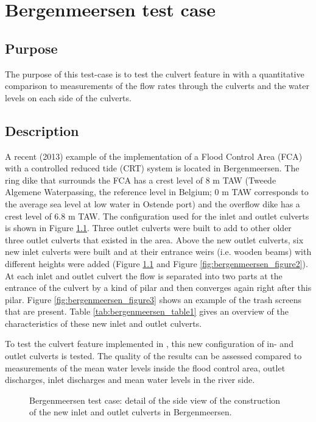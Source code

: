 \chapter{Bergenmeersen test case}

\section{Purpose}

The purpose of this test-case is to test the culvert feature in 
with a quantitative comparison to measurements of the flow rates through the
culverts and the water levels on each side of the culverts.

\section{Description}

A recent (2013) example of the implementation of a Flood Control Area (FCA) with
a controlled reduced
tide (CRT) system is located in Bergenmeersen.
The ring dike that surrounds the FCA has a crest level of 8 m TAW
(Tweede Algemene Waterpassing, the reference level in Belgium;
0 m TAW corresponds to the average sea level at low water in Ostende port)
and the overflow dike has a crest level of 6.8 m TAW.
The configuration used for the inlet and outlet culverts is shown in Figure
\ref{fig:bergenmeersen_figure1}.
Three outlet culverts were built to add to other older three outlet culverts
that existed in the area.
Above the new outlet culverts, six new inlet culverts were built and at their
entrance weirs (i.e. wooden beams)
with different heights were added (Figure \ref{fig:bergenmeersen_figure1} and
Figure \ref{fig:bergenmeersen_figure2}).
At each inlet and outlet culvert the flow is separated into two parts at the
entrance of the culvert
by a kind of pilar and then converges again right after this pilar.
Figure \ref{fig:bergenmeersen_figure3} shows an example of the trash screens
that are present.
Table \ref{tab:bergenmeersen_table1} gives an overview of the characteristics of
these new inlet and outlet culverts.

To test the culvert feature implemented in , this new configuration
of in- and outlet culverts is tested.
The quality of the results can be assessed compared to measurements of the mean
water levels inside the flood control area,
outlet discharges, inlet discharges and mean water levels in the river side.

\begin{figure}[H]
\begin{center}
\end{center}
\caption{Bergenmeersen test case: detail of the side view of
the construction of the new inlet and outlet culverts in Bergenmeersen.}
\label{fig:bergenmeersen_figure1}
\end{figure}

